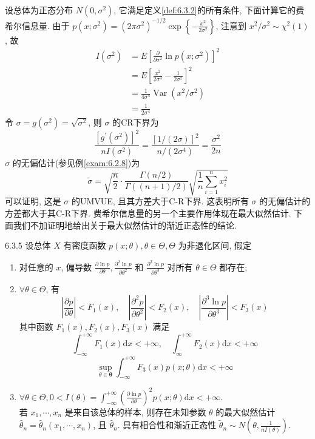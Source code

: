 \begin{example}\label{exam:6.3.7}
设总体为正态分布 $N\left(0, \sigma^{2}\right)$, 它满足定义\ref{def:6.3.2}的所有条件, 下面计算它的费希尔信息量. 由于 $p\left(x ; \sigma^{2}\right)=\left(2 \pi \sigma^{2}\right)^{-1 / 2} \exp \left\{-\frac{x^{2}}{2 \sigma^{2}}\right\}$, 注意到 $x^{2} / \sigma^{2} \sim \chi^{2}(1)$, 故
\begin{align*} I\left(\sigma^{2}\right) &=E\left[\frac{\partial}{\partial \sigma^{2}} \ln p\left(x ; \sigma^{2}\right)\right]^{2} \\ &=E\left[\frac{x^{2}}{2 \sigma^{4}}-\frac{1}{2 \sigma^{2}}\right]^{2} \\ &=\frac{1}{4 \sigma^{4}} \operatorname{Var}\left(x^{2} / \sigma^{2}\right) \\ &=\frac{1}{2 \sigma^{4}} \end{align*}
令 $\sigma=g\left(\sigma^{2}\right)=\sqrt{\sigma^{2}}$, 则 $\sigma$ 的CR下界为
\[\frac{\left[g^{\prime}\left(\sigma^{2}\right)\right]^{2}}{n I\left(\sigma^{2}\right)}=\frac{[1 /(2 \sigma)]^{2}}{n /\left(2 \sigma^{4}\right)}=\frac{\sigma^{2}}{2 n}\]
$\sigma$ 的无偏估计(参见例\ref{exam:6.2.8})为
\[\tilde{\sigma}=\sqrt{\frac{n}{2}} \cdot \frac{\Gamma(n / 2)}{\Gamma((n+1) / 2)} \sqrt{\frac{1}{n} \sum_{i=1}^{n} x_{i}^{2}}\]
可以证明, 这是 $\sigma$ 的UMVUE, 且其方差大于C-R下界. 这表明所有 $\sigma$ 的无偏估计的方差都大于其C-R下界.
费希尔信息量的另一个主要作用体现在最大似然估计. 下面我们不加证明地给出关于最大似然估计的渐近正态性的结论.
\end{example}

\begin{theorem}{}{6.3.5}
设总体 $X$ 有密度函数 $p(x ; \theta), \theta \in \Theta, \Theta$ 为非退化区间, 假定
\begin{enumerate}
\item 对任意的 $x$, 偏导数 $\frac{\partial \ln p}{\partial \theta}, \frac{\partial^{2} \ln p}{\partial \theta^{2}}$ 和 $\frac{\partial^{3} \ln p}{\partial \theta^{3}}$ 对所有 $\theta \in \Theta$ 都存在;
\item $\forall \theta \in \Theta$, 有
\[
\left|\frac{\partial p}{\partial \theta}\right|<F_{1}(x), \quad\left|\frac{\partial^{2} p}{\partial \theta^{2}}\right|<F_{2}(x), \quad\left|\frac{\partial^{3} \ln p}{\partial \theta^{3}}\right|<F_{3}(x)
\]
其中函数 $F_{1}(x), F_{2}(x), F_{3}(x)$ 满足
\[
\int_{-\infty}^{+\infty} F_{1}(x) \mathrm{d} x<+\infty, \quad \int_{\infty}^{+\infty} F_{2}(x) \mathrm{d} x<+\infty
\]\[
\sup _{\theta \in \boldsymbol{\theta}} \int_{-\infty}^{+\infty} F_{3}(x) p(x ; \theta) \mathrm{d} x<+\infty
\]
\item  $\forall \theta \in \Theta, 0<I(\theta)=\int_{-\infty}^{+\infty}\left(\frac{\partial \ln p}{\partial \theta}\right)^{2} p(x ; \theta) \mathrm{d} x<+\infty$.\\ 若 $x_{1}, \cdots, x_{n}$ 是来自该总体的样本, 则存在未知参数 $\theta$ 的最大似然估计 $\hat{\theta}_{n}=\hat{\theta}_{n}\left(x_{1}, \cdots, x_{n}\right)$, 且 $\hat{\theta}_{n}$. 具有相合性和渐近正态性 $\tilde{\theta}_{n} \sim N\left(\theta, \frac{1}{n I(\theta)}\right)$.
\end{enumerate}
\end{theorem}

